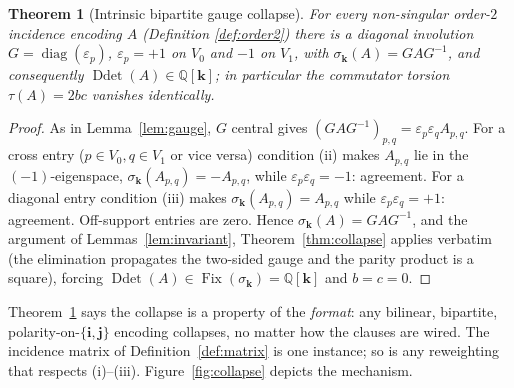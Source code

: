 \documentclass[pdflatex,sn-mathphys-num]{sn-jnl}
\theoremstyle{thmstyleone}%
\newtheorem{theorem}{Theorem}%
\theoremstyle{thmstyletwo}%
\theoremstyle{thmstylethree}%
\newcommand{\QQ}{\mathbb{Q}}
\newcommand{\Ddet}{\operatorname{Ddet}}
\newcommand{\Fix}{\operatorname{Fix}}
\newcommand{\bi}{\mathbf{i}}
\newcommand{\bj}{\mathbf{j}}
\newcommand{\bk}{\mathbf{k}}
\DeclareMathOperator{\diag}{diag}
\begin{document}
\begin{theorem}[Intrinsic bipartite gauge collapse]\label{thm:intrinsic}
For every non-singular order-$2$ incidence encoding $A$ (Definition
\ref{def:order2}) there is a diagonal involution $G=\diag(\varepsilon_p)$,
$\varepsilon_p=+1$ on $V_0$ and $-1$ on $V_1$, with
$\sigma_{\bk}(A)=GAG^{-1}$, and consequently $\Ddet(A)\in\QQ[\bk]$; in
particular the commutator torsion $\tau(A)=2bc$ vanishes identically.
\end{theorem}

\begin{proof}
As in Lemma~\ref{lem:gauge}, $G$ central gives
$(GAG^{-1})_{p,q}=\varepsilon_p\varepsilon_q A_{p,q}$. For a cross entry
($p\in V_0,q\in V_1$ or vice versa) condition (ii) makes $A_{p,q}$ lie in
the $(-1)$-eigenspace, $\sigma_{\bk}(A_{p,q})=-A_{p,q}$, while
$\varepsilon_p\varepsilon_q=-1$: agreement. For a diagonal entry condition
(iii) makes $\sigma_{\bk}(A_{p,q})=A_{p,q}$ while
$\varepsilon_p\varepsilon_q=+1$: agreement. Off-support entries are zero.
Hence $\sigma_{\bk}(A)=GAG^{-1}$, and the argument of
Lemmas~\ref{lem:invariant}, Theorem~\ref{thm:collapse} applies verbatim
(the elimination propagates the two-sided gauge and the parity product is a
square), forcing $\Ddet(A)\in\Fix(\sigma_{\bk})=\QQ[\bk]$ and $b=c=0$.
\end{proof}

Theorem~\ref{thm:intrinsic} says the collapse is a property of the
\emph{format}: any bilinear, bipartite, polarity-on-$\{\bi,\bj\}$ encoding
collapses, no matter how the clauses are wired. The incidence matrix of
Definition~\ref{def:matrix} is one instance; so is any reweighting that
respects (i)--(iii). Figure~\ref{fig:collapse} depicts the mechanism.
\end{document}
